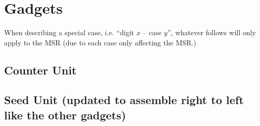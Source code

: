\section{Gadgets}
\label{gadgets}



\newcommand{\warpunit}{{\tt Warp\_Unit}}
\newcommand{\prewarp}{{\tt Pre\_Warp}}
\newcommand{\firstwarp}{{\tt First\_Warp}}
\newcommand{\warpbridge}{{\tt Warp\_Bridge}}
\newcommand{\secondwarp}{{\tt Second\_Warp}}
\newcommand{\postwarp}{{\tt Post\_Warp}}

\newcommand{\dtop}{{\tt Digit\_Top}}
\newcommand{\dwriter}{{\tt Digit\_Writer}}
\newcommand{\dreader}{{\tt Digit\_Reader}}

\newcommand{\returnfromdonereadnextrow}{{\tt Return\_From\_Digit1\_Read\_Next\_Row}}
\newcommand{\returnfromdtworeadnextrow}{{\tt Return\_From\_Digit2\_Read\_Next\_Row}}
\newcommand{\returnfromdthreereadnextrow}{{\tt Return\_From\_Digit3\_Read\_Next\_Row}}

\newcommand{\returnfromdonereaddtwo}{{\tt Return\_From\_Digit1\_Read\_Digit2}}
\newcommand{\returnfromdonereaddtwocasetwo}{{\tt Return\_From\_Digit1\_Read\_Digit2\_Case2}}
\newcommand{\returnfromdtworeaddthree}{{\tt Return\_From\_Digit2\_Read\_Digit3}}
\newcommand{\returnfromdthreereaddone}{{\tt Return\_From\_Digit3\_Read\_Digit1}}

\newcommand{\inc}{{\tt op}}

\newcommand{\dtopdonecaseone}{{\tt Digit\_Top\_Digit1\_Case1}}
\newcommand{\dtopdonecasetwo}{{\tt Digit\_Top\_Digit1\_Case2}}
\newcommand{\dtopdtwocasetwo}{{\tt Digit\_Top\_Digit2\_Case2}}
\newcommand{\dtopcasethree}{{\tt Digit\_Top\_Case3}}

When describing a special case, i.e. ``digit $x$ -- case $y$'', whatever follows
will only apply to the MSR (due to each case only affecting the MSR.)

\subsection{ Counter Unit }


    
    
    
    
    
    

    \subsection{Seed Unit (updated to assemble right to left like the other gadgets)}

